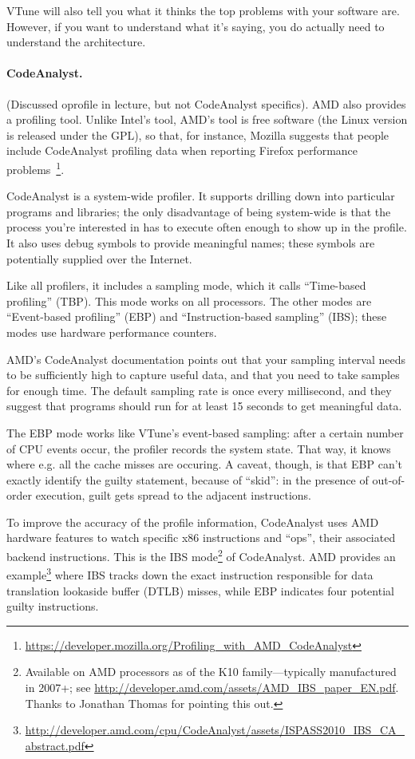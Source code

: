 VTune will also tell you what it thinks the top problems with your
software are. However, if you want to understand what it's saying,
you do actually need to understand the architecture.

\paragraph{CodeAnalyst.} (Discussed oprofile in lecture, but not CodeAnalyst
specifics).
AMD also provides a profiling tool. Unlike Intel's tool, AMD's tool is
free software (the Linux version is released under the GPL), so that,
for instance, Mozilla suggests that people include CodeAnalyst
profiling data when reporting Firefox performance
problems~\footnote{\url{https://developer.mozilla.org/Profiling_with_AMD_CodeAnalyst}}.

CodeAnalyst is a system-wide profiler. It supports drilling down into
particular programs and libraries; the only disadvantage of being
system-wide is that the process you're interested in has to execute
often enough to show up in the profile. It also uses debug symbols to
provide meaningful names; these symbols are potentially supplied over
the Internet.

Like all profilers, it includes a sampling mode, which it calls ``Time-based
profiling'' (TBP). This mode works on all processors. The other modes are 
``Event-based profiling'' (EBP) and ``Instruction-based sampling'' (IBS);
these modes use hardware performance counters.

AMD's CodeAnalyst documentation points out that your sampling interval
needs to be sufficiently high to capture useful data, and that you need to 
take samples for enough time. The default sampling rate is once every
millisecond, and they suggest that programs should run for at least 15 seconds
to get meaningful data.

The EBP mode works like VTune's event-based sampling: after a certain
number of CPU events occur, the profiler records the system state.
That way, it knows where e.g. all the cache misses are occuring.
A caveat, though, is that EBP can't exactly identify the guilty statement,
because of ``skid'': in the presence of out-of-order execution, guilt
gets spread to the adjacent instructions.

To improve the accuracy of the profile information, CodeAnalyst uses
AMD hardware features to watch specific x86 instructions and ``ops'',
their associated backend instructions. This is the IBS mode\footnote{Available
on AMD processors as of the K10 family---typically manufactured in 2007+; see \url{http://developer.amd.com/assets/AMD_IBS_paper_EN.pdf}. Thanks to Jonathan Thomas for pointing this out.} of
CodeAnalyst.  AMD provides an
example\footnote{\url{http://developer.amd.com/cpu/CodeAnalyst/assets/ISPASS2010_IBS_CA_abstract.pdf}}
where IBS tracks down the exact instruction responsible for data
translation lookaside buffer (DTLB) misses, while EBP indicates four
potential guilty instructions.


